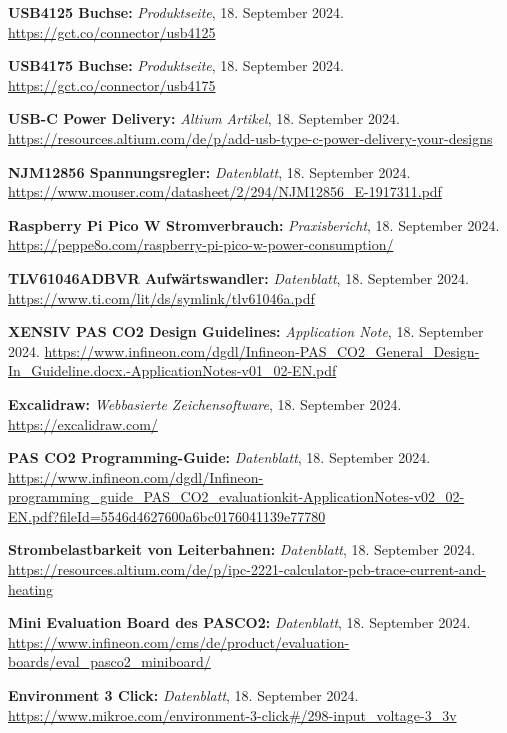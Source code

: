 \begin{thebibliography}{9999}
\textbf{USB4125 Buchse:} \textit{Produktseite}, 18. September 2024.  
\url{https://gct.co/connector/usb4125}

\textbf{USB4175 Buchse:} \textit{Produktseite}, 18. September 2024.  
\url{https://gct.co/connector/usb4175}

\textbf{USB-C Power Delivery:} \textit{Altium Artikel}, 18. September 2024.  
\url{https://resources.altium.com/de/p/add-usb-type-c-power-delivery-your-designs}

\textbf{NJM12856 Spannungsregler:} \textit{Datenblatt}, 18. September 2024.  
\url{https://www.mouser.com/datasheet/2/294/NJM12856_E-1917311.pdf}

\textbf{Raspberry Pi Pico W Stromverbrauch:} \textit{Praxisbericht}, 18. September 2024.  
\url{https://peppe8o.com/raspberry-pi-pico-w-power-consumption/}

\textbf{TLV61046ADBVR Aufwärtswandler:} \textit{Datenblatt}, 18. September 2024.  
\url{https://www.ti.com/lit/ds/symlink/tlv61046a.pdf}

\textbf{XENSIV PAS CO2 Design Guidelines:} \textit{Application Note}, 18. September 2024.  
\url{https://www.infineon.com/dgdl/Infineon-PAS_CO2_General_Design-In_Guideline.docx.-ApplicationNotes-v01_02-EN.pdf}

\textbf{Excalidraw:} \textit{Webbasierte Zeichensoftware}, 18. September 2024.  
\url{https://excalidraw.com/}

\textbf{PAS CO2 Programming-Guide:} \textit{Datenblatt}, 18. September 2024.  
\url{https://www.infineon.com/dgdl/Infineon-programming_guide_PAS_CO2_evaluationkit-ApplicationNotes-v02_02-EN.pdf?fileId=5546d4627600a6bc0176041139e77780}

\textbf{Strombelastbarkeit von Leiterbahnen:} \textit{Datenblatt}, 18. September 2024.  
\url{https://resources.altium.com/de/p/ipc-2221-calculator-pcb-trace-current-and-heating}

\textbf{Mini Evaluation Board des PASCO2:} \textit{Datenblatt}, 18. September 2024.  
\url{https://www.infineon.com/cms/de/product/evaluation-boards/eval_pasco2_miniboard/}

\textbf{Environment 3 Click:} \textit{Datenblatt}, 18. September 2024.  
\url{https://www.mikroe.com/environment-3-click#/298-input_voltage-3_3v}


\end{thebibliography}
